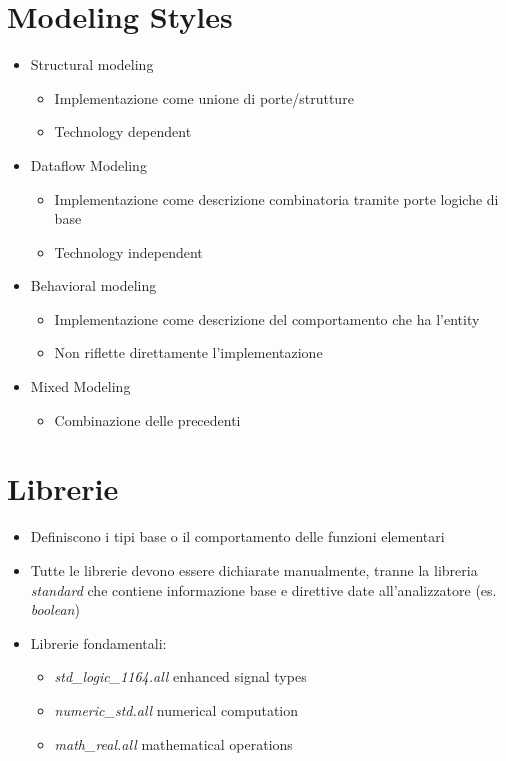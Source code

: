 \documentclass{article}
\begin{document}
\section{Modeling Styles}
\begin{itemize}
	\item Structural modeling
	      \begin{itemize}
	      	\item Implementazione come unione di porte/strutture
	      	\item Technology dependent
	      \end{itemize}
	\item Dataflow Modeling
	      \begin{itemize}
	      	\item Implementazione come descrizione combinatoria tramite porte logiche di base
	      	\item Technology independent
	      \end{itemize}
	\item Behavioral modeling
	      \begin{itemize}
	      	\item Implementazione come descrizione del comportamento che ha l'entity
	      	\item Non riflette direttamente l'implementazione
	      \end{itemize}
	\item Mixed Modeling
	      \begin{itemize}
	      	\item Combinazione delle precedenti
	      \end{itemize}
\end{itemize}
\newpage

\section{Librerie}
\begin{itemize}
	\item Definiscono i tipi base o il comportamento delle funzioni elementari
	\item Tutte le librerie devono essere dichiarate manualmente, tranne la libreria \textit{standard} che contiene informazione base e direttive date all'analizzatore (es. \textit{boolean})
	\item Librerie fondamentali:
	      \begin{itemize}
	      	\item \textit{std\_logic\_1164.all} enhanced signal types
	      	\item \textit{numeric\_std.all} numerical computation
	      	\item \textit{math\_real.all} mathematical operations
	      \end{itemize}
\end{itemize}
\end{document}
